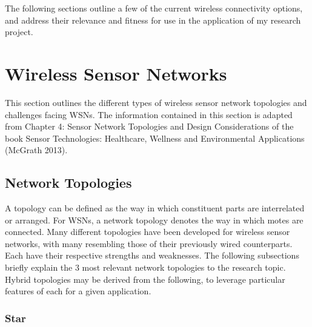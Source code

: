 The following sections outline a few of the current wireless connectivity options, and address their relevance and fitness for use in the application of my research project.



\section{Wireless Sensor Networks}

This section outlines the different types of wireless sensor network topologies and challenges facing WSNs. The information contained in this section is adapted from Chapter 4: Sensor Network Topologies and Design Considerations of the book Sensor Technologies: Healthcare, Wellness and Environmental Applications (McGrath 2013).


\subsection{Network Topologies}

A topology can be defined as the way in which constituent parts are interrelated or arranged. For WSNs, a network topology denotes the way in which motes are connected. Many different topologies have been developed for wireless sensor networks, with many resembling those of their previously wired counterparts. Each have their respective strengths and weaknesses. The following subsections briefly explain the 3 most relevant network topologies to the research topic. Hybrid topologies may be derived from the following, to leverage particular features of each for a given application.


\subsubsection{Star}

